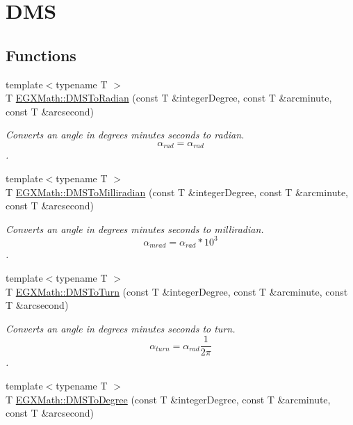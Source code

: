 \hypertarget{group___e_g_x_math-_angle_conversions-_d_m_s}{}\section{D\+MS}
\label{group___e_g_x_math-_angle_conversions-_d_m_s}
\subsection*{Functions}
\begin{DoxyCompactItemize}
\item 
{\footnotesize template$<$typename T $>$ }\\T \mbox{\hyperlink{group___e_g_x_math-_angle_conversions-_d_m_s_gaf87ebf95727895ba81084a2246e93211}{E\+G\+X\+Math\+::\+D\+M\+S\+To\+Radian}} (const T \&integer\+Degree, const T \&arcminute, const T \&arcsecond)
\begin{DoxyCompactList}\small\item\em Converts an angle in degrees minutes seconds to radian. \[\alpha_{rad}=\alpha_{rad}\]. \end{DoxyCompactList}\item 
{\footnotesize template$<$typename T $>$ }\\T \mbox{\hyperlink{group___e_g_x_math-_angle_conversions-_d_m_s_ga64258049da06b11e8ec77108ea80de82}{E\+G\+X\+Math\+::\+D\+M\+S\+To\+Milliradian}} (const T \&integer\+Degree, const T \&arcminute, const T \&arcsecond)
\begin{DoxyCompactList}\small\item\em Converts an angle in degrees minutes seconds to milliradian. \[\alpha_{mrad}=\alpha_{rad}*10^3\]. \end{DoxyCompactList}\item 
{\footnotesize template$<$typename T $>$ }\\T \mbox{\hyperlink{group___e_g_x_math-_angle_conversions-_d_m_s_ga9ed22b7d1d3bafe2ee8e4c81510a77fa}{E\+G\+X\+Math\+::\+D\+M\+S\+To\+Turn}} (const T \&integer\+Degree, const T \&arcminute, const T \&arcsecond)
\begin{DoxyCompactList}\small\item\em Converts an angle in degrees minutes seconds to turn. \[\alpha_{turn}=\alpha_{rad}\frac{1}{2 \pi}\]. \end{DoxyCompactList}\item 
{\footnotesize template$<$typename T $>$ }\\T \mbox{\hyperlink{group___e_g_x_math-_angle_conversions-_d_m_s_ga3744d5ef737f693a191efc151d8ef3f3}{E\+G\+X\+Math\+::\+D\+M\+S\+To\+Degree}} (const T \&integer\+Degree, const T \&arcminute, const T \&arcsecond)

\end{DoxyCompactItemize}
